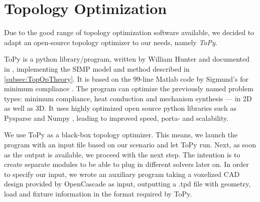 \section{Topology Optimization}
\label{sec:ToPy}
Due to the good range of topology optimization software available, we decided to adapt an open-source topology optimizer to our needs, namely \emph{ToPy}.


ToPy \cite{ToPy} is a python library/program, written by William Hunter and documented in \cite{Hunter2009}, implementing the SIMP model and method described in \autoref{subsec:TopOpTheory}. It is based on the 99-line Matlab code by Sigmund's for minimum compliance \cite{sigmund200199}. The program can optimize the previously named problem types: minimum compliance, heat conduction and mechanism synthesis --- in 2D as well as 3D. It uses highly optimized open source python libraries such as Pysparse \cite{Pysparse} and Numpy \cite{Numpy}, leading to improved speed, porta- and scalability. %


We use ToPy as a black-box topology optimizer. This means, we launch the program with an input file based on our scenario and let ToPy run. Next, as soon as the output is available, we proceed with the next step. The intention is to create separate modules to be able to plug in different solvers later on. In order to specify our input, we wrote an auxiliary program taking a voxelized CAD design provided by OpenCascade as input, outputting a .tpd file with geometry, load and fixture information in the format required by ToPy. 

